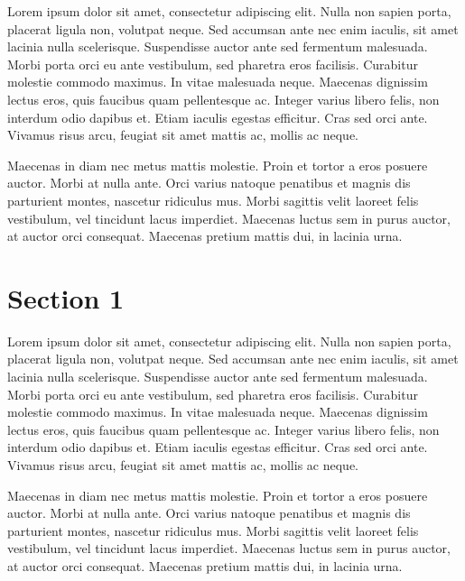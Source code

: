 Lorem ipsum dolor sit amet, consectetur adipiscing elit. Nulla non sapien porta, placerat ligula non, volutpat neque. Sed accumsan ante nec enim iaculis, sit amet lacinia nulla scelerisque. Suspendisse auctor ante sed fermentum malesuada. Morbi porta orci eu ante vestibulum, sed pharetra eros facilisis. Curabitur molestie commodo maximus. In vitae malesuada neque. Maecenas dignissim lectus eros, quis faucibus quam pellentesque ac. Integer varius libero felis, non interdum odio dapibus et. Etiam iaculis egestas efficitur. Cras sed orci ante. Vivamus risus arcu, feugiat sit amet mattis ac, mollis ac neque.

Maecenas in diam nec metus mattis molestie. Proin et tortor a eros posuere auctor. Morbi at nulla ante. Orci varius natoque penatibus et magnis dis parturient montes, nascetur ridiculus mus. Morbi sagittis velit laoreet felis vestibulum, vel tincidunt lacus imperdiet. Maecenas luctus sem in purus auctor, at auctor orci consequat. Maecenas pretium mattis dui, in lacinia urna. 

\section{Section 1}

Lorem ipsum dolor sit amet, consectetur adipiscing elit. Nulla non sapien porta, placerat ligula non, volutpat neque. Sed accumsan ante nec enim iaculis, sit amet lacinia nulla scelerisque. Suspendisse auctor ante sed fermentum malesuada. Morbi porta orci eu ante vestibulum, sed pharetra eros facilisis. Curabitur molestie commodo maximus. In vitae malesuada neque. Maecenas dignissim lectus eros, quis faucibus quam pellentesque ac. Integer varius libero felis, non interdum odio dapibus et. Etiam iaculis egestas efficitur. Cras sed orci ante. Vivamus risus arcu, feugiat sit amet mattis ac, mollis ac neque.

Maecenas in diam nec metus mattis molestie. Proin et tortor a eros posuere auctor. Morbi at nulla ante. Orci varius natoque penatibus et magnis dis parturient montes, nascetur ridiculus mus. Morbi sagittis velit laoreet felis vestibulum, vel tincidunt lacus imperdiet. Maecenas luctus sem in purus auctor, at auctor orci consequat. Maecenas pretium mattis dui, in lacinia urna. 